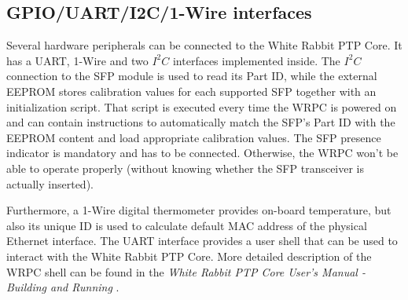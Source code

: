 \subsection{GPIO/UART/I2C/1-Wire interfaces}
\label{sec:wrpc_periph}


Several hardware peripherals can be connected to the White Rabbit PTP Core. It has a UART, 1-Wire
and two $I^2C$ interfaces implemented inside. The $I^2C$ connection to the SFP module is used to
read its Part ID, while the external EEPROM stores calibration values for each supported SFP
together with an initialization script. That script is executed every time the WRPC is powered on
and can contain instructions to automatically match the SFP's Part ID with the EEPROM content and
load appropriate calibration values. The SFP presence indicator is mandatory and has to be
connected.  Otherwise, the WRPC won't be able to operate properly (without knowing whether the SFP
transceiver is actually inserted).

Furthermore, a 1-Wire digital thermometer provides on-board temperature, but also its unique ID is
used to calculate default MAC address of the physical Ethernet interface. The UART interface
provides a user shell that can be used to interact with the White Rabbit PTP Core. More detailed
description of the WRPC shell can be found in the \emph{White Rabbit PTP Core User's Manual -
  Building and Running} \cite{wrpc_man}.
